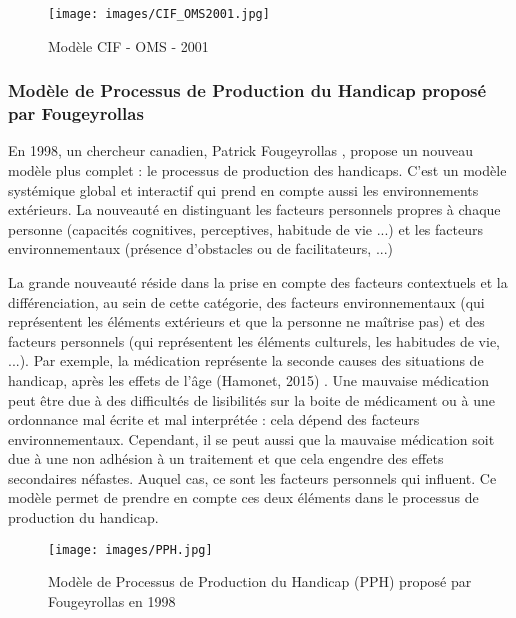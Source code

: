 \begin{figure}[htbp]%
\begin{center}
\texttt{[image: images/CIF\_OMS2001.jpg]} 
\end{center}
\caption{Modèle CIF - OMS - 2001}
\label{ModeleCIF2001}
\end{figure}

\subsubsection{Modèle de Processus de Production du Handicap proposé par Fougeyrollas}

En 1998, un chercheur canadien, Patrick Fougeyrollas \cite{Fougeyrollas1998}, propose un nouveau modèle plus complet : \og le processus de production des handicaps\fg{}. C'est un modèle systémique global et interactif qui prend en compte aussi les environnements extérieurs. La nouveauté en distinguant les facteurs personnels propres à chaque personne (capacités cognitives, perceptives, habitude de vie ...) et les facteurs environnementaux (présence d'obstacles ou de facilitateurs, ...)

La grande nouveauté réside dans la prise en compte des facteurs contextuels et la différenciation, au sein de cette catégorie, des facteurs environnementaux (qui représentent les éléments extérieurs et que la personne ne maîtrise pas) et des facteurs personnels (qui représentent les éléments culturels, les habitudes de vie, ...). Par exemple, la médication représente la seconde causes des situations de handicap, après les effets de l'âge (Hamonet, 2015) \cite{Hamonet2015}. Une mauvaise médication peut être due à des difficultés de lisibilités sur la boite de médicament ou à une ordonnance mal écrite et mal interprétée : cela dépend des facteurs environnementaux. Cependant, il se peut aussi que la mauvaise médication soit due à une non adhésion à un traitement et que cela engendre des effets secondaires néfastes. Auquel cas, ce sont les facteurs personnels qui influent. Ce modèle permet de prendre en compte ces deux éléments dans le processus de production du handicap.
 


\begin{figure}[htbp]
\begin{center}
\texttt{[image: images/PPH.jpg]} 
\end{center}
\caption{\label{PPH}Modèle de Processus de Production du Handicap (PPH) proposé par Fougeyrollas en 1998} 
\end{figure}

